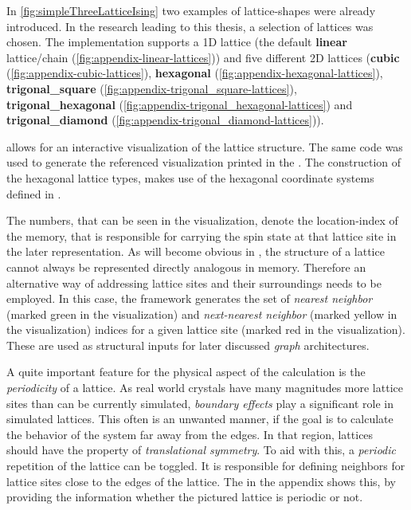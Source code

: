 In \autoref{fig:simpleThreeLatticeIsing} two examples of lattice-shapes were already introduced.
In the research leading to this thesis, a selection of lattices was chosen.
The implementation supports a 1D lattice (the default \textbf{linear} lattice/chain  (\autoref{fig:appendix-linear-lattices})) and five different 2D lattices 
(\textbf{cubic} (\autoref{fig:appendix-cubic-lattices}), \textbf{hexagonal} (\autoref{fig:appendix-hexagonal-lattices}), \textbf{trigonal\_square} (\autoref{fig:appendix-trigonal_square-lattices}), \textbf{trigonal\_hexagonal} (\autoref{fig:appendix-trigonal_hexagonal-lattices}) and \textbf{trigonal\_diamond} (\autoref{fig:appendix-trigonal_diamond-lattices})).

 allows for an interactive visualization of the lattice structure.
The same code was used to generate the referenced visualization printed in the .
The construction of the hexagonal lattice types, makes use of the hexagonal coordinate systems defined in \cite[]{hexagonalGrids}.

The numbers, that can be seen in the visualization, denote the location-index of the memory, that is responsible for carrying the spin state at that lattice site in the later representation. As will become obvious in , the structure of a lattice cannot always be represented directly analogous in memory. Therefore an alternative way of addressing lattice sites and their surroundings needs to be employed.
In this case, the framework generates the set of \emph{nearest neighbor} (marked green in the visualization) and \emph{next-nearest neighbor} (marked yellow in the visualization) indices for a given lattice site (marked red in the visualization). These are used as structural inputs for later discussed \emph{graph} architectures.

A quite important feature for the physical aspect of the calculation is the \emph{periodicity} of a lattice. 
As real world crystals have many magnitudes more lattice sites than can be currently simulated, \emph{boundary effects} play a significant role in simulated lattices.
This often is an unwanted manner, if the goal is to calculate the behavior of the system far away from the edges. 
In that region, lattices should have the property of \emph{translational symmetry}. 
To aid with this, a \emph{periodic} repetition of the lattice can be toggled. 
It is responsible for defining neighbors for lattice sites close to the edges of the lattice.
The  in the appendix shows this, by providing the information whether the pictured lattice is periodic or not.

